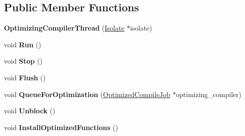 \subsection*{Public Member Functions}
\begin{DoxyCompactItemize}
\item 
\hypertarget{classv8_1_1internal_1_1_optimizing_compiler_thread_a1b7d327189453d2688d294aca66243f3}{}{\bfseries Optimizing\+Compiler\+Thread} (\hyperlink{classv8_1_1internal_1_1_isolate}{Isolate} $\ast$isolate)\label{classv8_1_1internal_1_1_optimizing_compiler_thread_a1b7d327189453d2688d294aca66243f3}

\item 
\hypertarget{classv8_1_1internal_1_1_optimizing_compiler_thread_a4676864441a775937daed90110c4a777}{}void {\bfseries Run} ()\label{classv8_1_1internal_1_1_optimizing_compiler_thread_a4676864441a775937daed90110c4a777}

\item 
\hypertarget{classv8_1_1internal_1_1_optimizing_compiler_thread_a3bd40af2a55d12a880ef4181a178bed2}{}void {\bfseries Stop} ()\label{classv8_1_1internal_1_1_optimizing_compiler_thread_a3bd40af2a55d12a880ef4181a178bed2}

\item 
\hypertarget{classv8_1_1internal_1_1_optimizing_compiler_thread_a834b519d418027ee97eb2184a81cc115}{}void {\bfseries Flush} ()\label{classv8_1_1internal_1_1_optimizing_compiler_thread_a834b519d418027ee97eb2184a81cc115}

\item 
\hypertarget{classv8_1_1internal_1_1_optimizing_compiler_thread_ae4c529256bde2dce9b30269d03585de5}{}void {\bfseries Queue\+For\+Optimization} (\hyperlink{classv8_1_1internal_1_1_optimized_compile_job}{Optimized\+Compile\+Job} $\ast$optimizing\+\_\+compiler)\label{classv8_1_1internal_1_1_optimizing_compiler_thread_ae4c529256bde2dce9b30269d03585de5}

\item 
\hypertarget{classv8_1_1internal_1_1_optimizing_compiler_thread_a65a0d3d4e6760e0b4f6adff718084f4e}{}void {\bfseries Unblock} ()\label{classv8_1_1internal_1_1_optimizing_compiler_thread_a65a0d3d4e6760e0b4f6adff718084f4e}

\item 
\hypertarget{classv8_1_1internal_1_1_optimizing_compiler_thread_a46dbc1aeab2bde4cd4d888bb1b29c3d2}{}void {\bfseries Install\+Optimized\+Functions} ()\label{classv8_1_1internal_1_1_optimizing_compiler_thread_a46dbc1aeab2bde4cd4d888bb1b29c3d2}


\end{DoxyCompactItemize}
